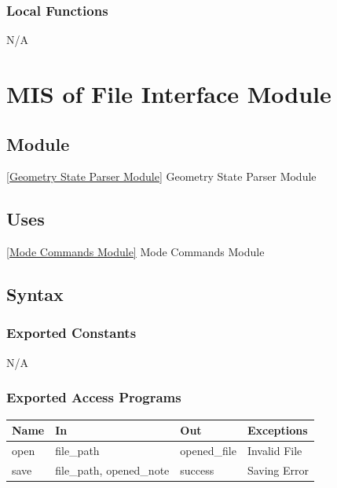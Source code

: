 \documentclass[12pt, titlepage]{article}
\begin{document}
\subsubsection{Local Functions}

N/A
\newpage
\section{MIS of {File Interface Module}} \label{File Interface Module}
%
%

\subsection{Module}

\ref{Geometry State Parser Module} {Geometry State Parser Module}

\subsection{Uses}

\ref{Mode Commands Module} {Mode Commands Module}

\subsection{Syntax}

\subsubsection{Exported Constants}
N/A
\subsubsection{Exported Access Programs}

\begin{center}
\begin{tabular}{p{2cm} p{4cm} p{4cm} p{2cm}}
\hline
\textbf{Name} & \textbf{In} & \textbf{Out} & \textbf{Exceptions} \\
\hline
{open} & file\_path & opened\_file & Invalid File \\
\hline
{save} & file\_path, opened\_note & success & Saving Error \\
\hline
\end{tabular}
\end{center}
\end{document}
